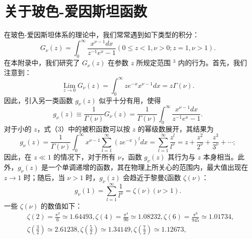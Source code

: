 \section{关于玻色-爱因斯坦函数}\label{d-ux5173ux4e8eux73bbux8272-ux7231ux56e0ux65afux5766ux51fdux6570}
在玻色-爱因斯坦体系的理论中，我们常常遇到如下类型的积分：
\begin{equation}\tag{17.4.1}\label{eq:17.4.1}
G _ { \nu } ( z ) = \int _ { 0 } ^{\infty} \frac { x ^{\nu - 1} d x } { z ^{- 1} e ^{x} - 1 }  ( 0 \leq z < 1 , \nu > 0 ; z = 1 , \nu > 1 ) .
\end{equation}
在本附录中，我们研究了 \(G_{\nu}(z)\) 在参数 \(z\) 所规定范围 \(^{3}\) 内的行为。首先，我们注意到：
\begin{equation}\tag{17.4.2}\label{eq:17.4.2}
\operatorname* { L i m } _ { z \to 0 } G _ { \nu } ( z ) = \int _ { 0 } ^{\infty} z e ^{- x} x ^{\nu - 1} d x = z \Gamma ( \nu ) .
\end{equation}
因此，引入另一类函数 \(g_{\nu}(z)\) 似乎十分有用，使得
\begin{equation}\tag{17.4.3}\label{eq:17.4.3}
g _ { \nu } ( z ) \equiv \frac { 1 } { \Gamma ( \nu ) } G _ { \nu } ( z ) = \frac { 1 } { \Gamma ( \nu ) } \int _ { 0 } ^{\infty} \frac { x ^{\nu - 1} d x } { z ^{- 1} e ^{x} - 1 } .
\end{equation}
对于小的 \(z\)，式（3）中的被积函数可以按 \(z\) 的幂级数展开，其结果为
\begin{equation}\tag{17.4.4}\label{eq:17.4.4}
g _ { \nu } ( z ) = \frac { 1 } { \Gamma ( \nu ) } \int _ { 0 } ^{\infty} x ^{\nu - 1} \sum _ { l = 1 } ^{\infty} ( z e ^{- x} ) ^{l} d x = \sum _ { l = 1 } ^{\infty} \frac { z ^{l} } { l ^{\nu} } = z + \frac { z ^{2} } { 2 ^{\nu} } + \frac { z ^{3} } { 3 ^{\nu} } + \cdots ;
\end{equation}
因此，在 \(z \ll 1\) 的情况下，对于所有 \(\nu\)，函数 \(g_{\nu}(z)\) 其行为与 \(z\) 本身相当。此外，\(g_{\nu}(z)\) 是一个单调递增的函数，其在物理上所关心的范围内，最大值出现在 \(z \to 1\) 时；随后，当 \(\nu > 1\) 时，\(g_{\nu}(z)\) 会趋近于黎曼ζ函数 \(\zeta(\nu)\)：
\begin{equation}\tag{17.4.5}\label{eq:17.4.5}
g _ { \nu } ( 1 ) = \sum _ { l = 1 } ^{\infty} \frac { 1 } { l ^{\nu} } = \zeta ( \nu )  ( \nu > 1 ) .
\end{equation}
一些 \(\zeta(\nu)\) 的数值如下：
\begin{equation}\tag{17.4.6}\label{eq:17.4.6}
\begin{array}{rl} & { \zeta ( 2 ) = \frac { \pi ^{2} } { 6 } \simeq 1 . 64 49 3 ,  \zeta ( 4 ) = \frac { \pi ^{4} } { 90 } \simeq 1 . 08 23 2 ,  \zeta ( 6 ) = \frac { \pi ^{6} } { 94 5 } \simeq 1 . 01 73 4 , } \\& { \zeta \left( \frac { 3 } { 2 } \right) \simeq 2 . 61 23 8 ,  \zeta \left( \frac { 5 } { 2 } \right) \simeq 1 . 34 14 9 ,  \zeta \left( \frac { 7 } { 2 } \right) \simeq 1 . 12 67 3 , } \end{array}
\end{equation}

